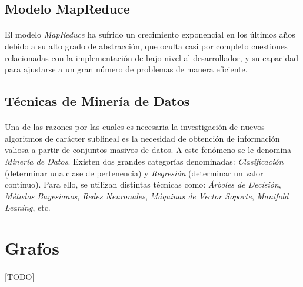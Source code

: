 \documentclass{subfiles}
\begin{document}
        \subsection{Modelo MapReduce}

          \paragraph{}
          El modelo \emph{MapReduce} ha sufrido un crecimiento exponencial en los últimos años debido a su alto grado de abstracción, que oculta casi por completo cuestiones relacionadas con la implementación de bajo nivel al desarrollador, y su capacidad para ajustarse a un gran número de problemas de manera eficiente.

      \subsection{Técnicas de Minería de Datos}

        \paragraph{}
        Una de las razones por las cuales es necesaria la investigación de nuevos algoritmos de carácter sublineal es la necesidad de obtención de información valiosa a partir de conjuntos masivos de datos. A este fenómeno se le denomina \emph{Minería de Datos}. Existen dos grandes categorías denominadas: \emph{Clasificación} (determinar una clase de pertenencia) y \emph{Regresión} (determinar un valor continuo). Para ello, se utilizan distintas técnicas como: \emph{Árboles de Decisión}, \emph{Métodos Bayesianos}, \emph{Redes Neuronales}, \emph{Máquinas de Vector Soporte}, \emph{Manifold Leaning}, etc.

    \section{Grafos}
    \label{sec:introduction_graphs}

      \paragraph{}
      [TODO]
\end{document}
